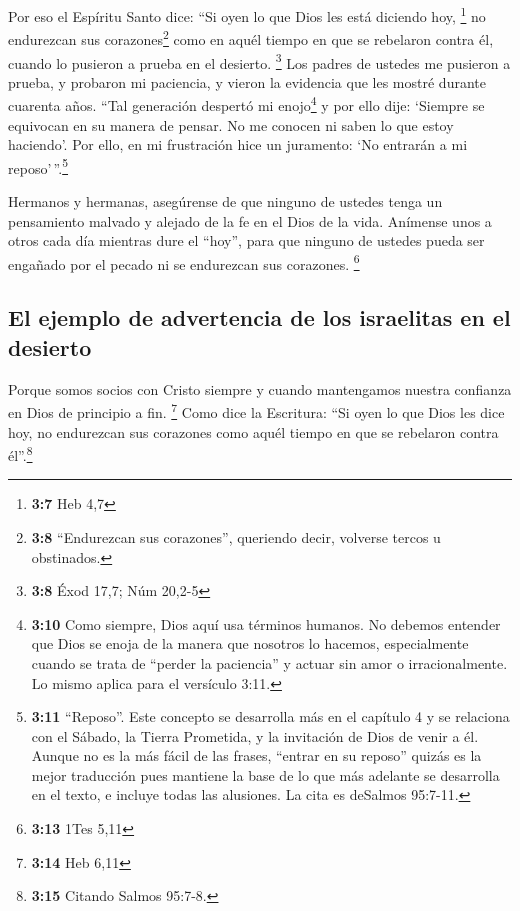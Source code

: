  Por eso el Espíritu Santo dice: ``Si oyen lo que Dios les
está diciendo hoy, \footnote{\textbf{3:7} Heb 4,7}  no
endurezcan sus corazones\footnote{\textbf{3:8} ``Endurezcan sus
  corazones'', queriendo decir, volverse tercos u obstinados.} como en
aquél tiempo en que se rebelaron contra él, cuando lo pusieron a prueba
en el desierto. \footnote{\textbf{3:8} Éxod 17,7; Núm 20,2-5}
 Los padres de ustedes me pusieron a prueba, y probaron mi
paciencia, y vieron la evidencia que les mostré durante cuarenta años.
 ``Tal generación despertó mi enojo\footnote{\textbf{3:10}
  Como siempre, Dios aquí usa términos humanos. No debemos entender que
  Dios se enoja de la manera que nosotros lo hacemos, especialmente
  cuando se trata de ``perder la paciencia'' y actuar sin amor o
  irracionalmente. Lo mismo aplica para el versículo 3:11.} y por ello
dije: `Siempre se equivocan en su manera de pensar. No me conocen ni
saben lo que estoy haciendo'.  Por ello, en mi
frustración hice un juramento: `No entrarán a mi reposo'\,''.\footnote{\textbf{3:11}
  ``Reposo''. Este concepto se desarrolla más en el capítulo 4 y se
  relaciona con el Sábado, la Tierra Prometida, y la invitación de Dios
  de venir a él. Aunque no es la más fácil de las frases, ``entrar en su
  reposo'' quizás es la mejor traducción pues mantiene la base de lo que
  más adelante se desarrolla en el texto, e incluye todas las alusiones.
  La cita es deSalmos 95:7-11.}

 Hermanos y hermanas, asegúrense de que ninguno de
ustedes tenga un pensamiento malvado y alejado de la fe en el Dios de la
vida.  Anímense unos a otros cada día mientras dure el
``hoy'', para que ninguno de ustedes pueda ser engañado por el pecado ni
se endurezcan sus corazones. \footnote{\textbf{3:13} 1Tes 5,11}

\hypertarget{el-ejemplo-de-advertencia-de-los-israelitas-en-el-desierto}{%
\subsection{El ejemplo de advertencia de los israelitas en el
desierto}\label{el-ejemplo-de-advertencia-de-los-israelitas-en-el-desierto}}

 Porque somos socios con Cristo siempre y cuando
mantengamos nuestra confianza en Dios de principio a fin. \footnote{\textbf{3:14}
  Heb 6,11}  Como dice la Escritura: ``Si oyen lo que
Dios les dice hoy, no endurezcan sus corazones como aquél tiempo en que
se rebelaron contra él''.\footnote{\textbf{3:15} Citando Salmos 95:7-8.}


